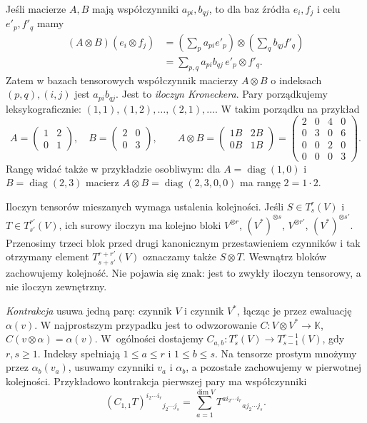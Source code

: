 Jeśli macierze $A,B$ mają współczynniki $a_{pi},b_{qj}$,
to dla baz źródła $e_i,f_j$ i celu $e'_p,f'_q$ mamy
\[
 \begin{aligned}
 (A\otimes B)(e_i\otimes f_j)
 &=\left(\sum_p a_{pi}e'_p\right)\otimes
   \left(\sum_q b_{qj}f'_q\right)\\
 &=\sum_{p,q}a_{pi}b_{qj}\,e'_p\otimes f'_q.
 \end{aligned}
\]
Zatem w bazach tensorowych współczynnik macierzy
$A\otimes B$ o indeksach $(p,q),(i,j)$ jest $a_{pi}b_{qj}$.
Jest to \emph{iloczyn Kroneckera}. Pary porządkujemy
leksykograficznie: $(1,1),(1,2),\ldots,(2,1),\ldots$.
W takim porządku na przykład
\[
 A=\begin{pmatrix}1&2\\0&1\end{pmatrix},\quad
 B=\begin{pmatrix}2&0\\0&3\end{pmatrix},\qquad
 A\otimes B=
 \begin{pmatrix}1B&2B\\0B&1B\end{pmatrix}
 =
 \begin{pmatrix}
 2&0&4&0\\0&3&0&6\\0&0&2&0\\0&0&0&3
 \end{pmatrix}.
\]
Rangę widać także w przykładzie osobliwym: dla
$A=\operatorname{diag}(1,0)$ i $B=\operatorname{diag}(2,3)$
macierz $A\otimes B=\operatorname{diag}(2,3,0,0)$ ma
rangę $2=1\cdot2$.

Iloczyn tensorów mieszanych wymaga ustalenia kolejności.
Jeśli $S\in T^r_s(V)$ i $T\in T^{r'}_{s'}(V)$, ich surowy
iloczyn ma kolejno bloki $V^{\otimes r}$, $(V^*)^{\otimes s}$,
$V^{\otimes r'}$, $(V^*)^{\otimes s'}$. Przenosimy trzeci blok
przed drugi kanonicznym przestawieniem czynników i tak otrzymany
element $T^{r+r'}_{s+s'}(V)$ oznaczamy także $S\otimes T$.
Wewnątrz bloków zachowujemy kolejność. Nie pojawia się znak:
jest to zwykły iloczyn tensorowy, a nie iloczyn zewnętrzny.

\begin{definicja}[Kontrakcja]
\label{def:kontrakcja}
\emph{Kontrakcja} usuwa jedną parę: czynnik $V$ i czynnik $V^*$,
łącząc je przez ewaluację $\alpha(v)$. W najprostszym przypadku
jest to odwzorowanie $C\colon V\otimes V^*\to\mathbb K$,
$C(v\otimes\alpha)=\alpha(v)$. W~ogólności dostajemy
$C_{a,b}\colon T^r_s(V)\to T^{r-1}_{s-1}(V)$, gdy $r,s\geq1$.
Indeksy spełniają $1\leq a\leq r$ i $1\leq b\leq s$.
Na tensorze prostym mnożymy przez $\alpha_b(v_a)$,
usuwamy czynniki $v_a$ i $\alpha_b$, a pozostałe zachowujemy
w pierwotnej kolejności. Przykładowo kontrakcja pierwszej pary ma współczynniki
\[
 (C_{1,1}T)^{i_2\cdots i_r}{}_{j_2\cdots j_s}
 =\sum_{a=1}^{\dim V}T^{a i_2\cdots i_r}{}_{a j_2\cdots j_s}.
\]
\end{definicja}

